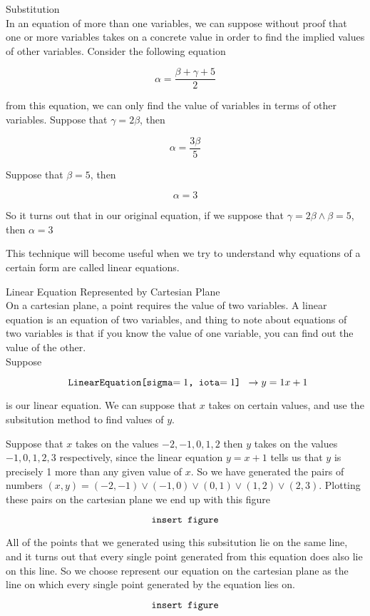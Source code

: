 \documentclass{book}
\begin{document}
  {\remark Substitution \\

    In an equation of more than one variables, we can suppose without proof that one or more variables takes on a concrete value in order to find the implied values of other variables. Consider the following equation

    $$\alpha = \frac{\beta + \gamma + 5}{2}$$

    from this equation, we can only find the value of variables in terms of other variables. Suppose that $\gamma = 2\beta$, then

    $$\alpha = \frac{3\beta}{5}$$

    Suppose that $\beta = 5$, then

    $$\alpha = 3$$

    So it turns out that in our original equation, if we suppose that $\gamma = 2\beta \land \beta = 5$, then $\alpha = 3$

    This technique will become useful when we try to understand why equations of a certain form are called linear equations.\\
  }

  {\remark Linear Equation Represented by Cartesian Plane \\
    On a cartesian plane, a point requires the value of two variables. A linear equation is an equation of two variables, and thing to note about equations of two variables is that if you know the value of one variable, you can find out the value of the other.\\

    Suppose

    $$\text{\texttt{ LinearEquation[sigma$= {1}$, iota$= {1}$] }}\to y = {1}x + {1}$$

    is our linear equation. We can suppose that $x$ takes on certain values, and use the subsitution method to find values of $y$.

    Suppose that $x$ takes on the values $-2, -1, 0, 1, 2$ then $y$ takes on the values $-1, 0, 1, 2, 3$ respectively, since the linear equation $y = x + 1$ tells us that $y$ is precisely 1 more than any given value of $x$. So we have generated the pairs of numbers $(x, y) = (-2, -1) \lor (-1, 0) \lor (0, 1) \lor (1, 2) \lor (2, 3)$. Plotting these pairs on the cartesian plane we end up with this figure

    $$\text{\texttt{insert figure}}$$

    All of the points that we generated using this subsitution lie on the same line, and it turns out that every single point generated from this equation does also lie on this line. So we choose represent our equation on the cartesian plane as the line on which every single point generated by the equation lies on.

    $$\text{\texttt{insert figure}}$$
  }
\end{document}
